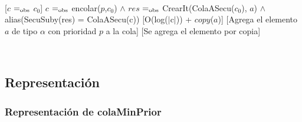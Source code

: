	~

	[$c$ $=_{\mathrm{obs}}$ $c_0$]
	{$c$ $=_{\mathrm{obs}}$ encolar($p$,$c_0$) $\wedge$ $res$ $=_{\mathrm{obs}}$ CrearIt(ColaASecu($c_0$), $a$) $\wedge$ alias(SecuSuby(res) = ColaASecu(c))}
	[O(log($\vert$c$\vert$)) + $copy$($a$)]
	[Agrega el elemento $a$ de tipo $\alpha$ con prioridad $p$ a la cola]
	[Se agrega el elemento por copia]

	~




\subsection{Representación}

	\subsubsection{Representación de colaMinPrior}

